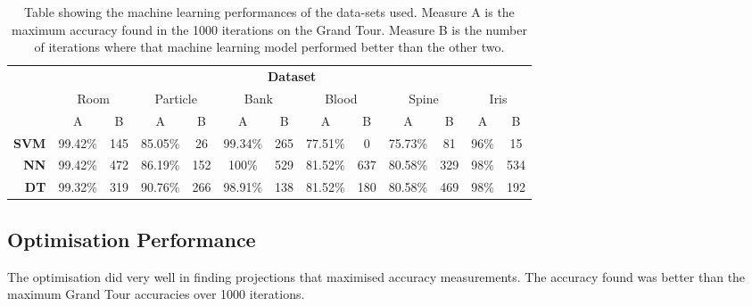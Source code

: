\documentclass[a4paper,11pt,twoside]{article}
\begin{document}
\begin{table}[h]
\caption{Table showing the machine learning performances of the data-sets used. Measure A is the maximum accuracy found in the 1000 iterations on the Grand Tour. Measure B is the number of iterations where that machine learning model performed better than the other two.}
\begin{tabular}{r|c|c|c|c|c|c|c|c|c|c|c|c|} 
\cline{2-13}

\multicolumn{1}{l|}{}              & \multicolumn{12}{c|}{\textbf{Dataset}}                                                                                                                                      \\ \cline{2-13} 
\multicolumn{1}{l|}{}              & \multicolumn{2}{c|}{Room} & \multicolumn{2}{c|}{Particle} & \multicolumn{2}{c|}{Bank} & \multicolumn{2}{c|}{Blood} & \multicolumn{2}{c|}{Spine} & \multicolumn{2}{c|}{Iris} \\ \cline{2-13} 
                                   & A             & B         & A               & B           & A             & B         & A              & B         & A              & B         & A            & B          \\ \hline
\multicolumn{1}{|r|}{\textbf{SVM}} & 99.42\%       & 145       & 85.05\%         & 26          & 99.34\%       & 265       & 77.51\%        & 0         & 75.73\%        & 81        & 96\%         & 15         \\ \hline
\multicolumn{1}{|r|}{\textbf{NN}}  & 99.42\%       & 472       & 86.19\%         & 152         & 100\%         & 529       & 81.52\%        & 637       & 80.58\%        & 329       & 98\%         & 534        \\ \hline
\multicolumn{1}{|r|}{\textbf{DT}}  & 99.32\%       & 319       & 90.76\%         & 266         & 98.91\%       & 138       & 81.52\%        & 180       & 80.58\%        & 469       & 98\%         & 192        \\ \hline

\end{tabular}

\end{table}

\subsection{Optimisation Performance}

The optimisation did very well in finding projections that maximised accuracy measurements. The accuracy found was better than the maximum Grand Tour accuracies over 1000 iterations.
\end{document}
